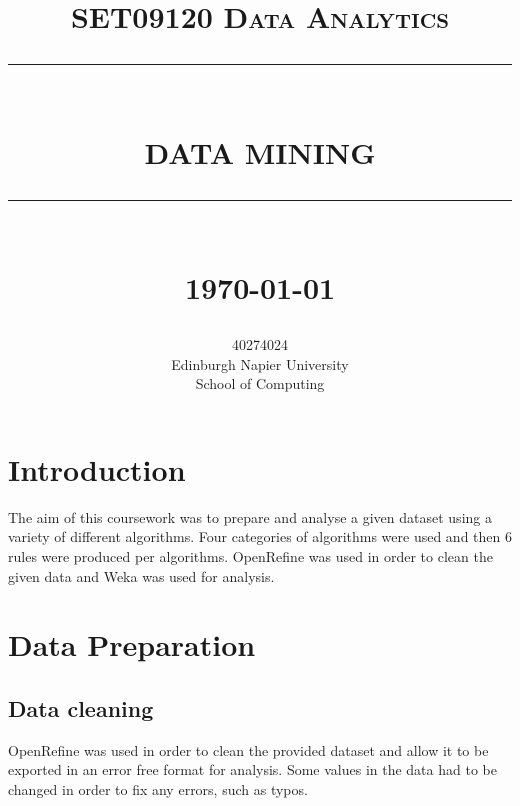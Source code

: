 \documentclass[12pt]{article}
\newcommand{\HRule}[1]{\rule{\linewidth}{#1}}
\begin{document}
\title{ \normalsize \textsc{SET09120 Data Analytics}
		\\ [2.0cm]
		\HRule{0.5pt} \\
		\LARGE \textbf{\uppercase{Data Mining}}
		\HRule{2pt} \\ [0.5cm]
		\normalsize \monthyeardate\today \vspace*{5\baselineskip}}

\author{
		40274024 \\ 
		Edinburgh Napier University \\
		School of Computing 
		\date{}}

\maketitle

\newpage

\sectionfont{\scshape}


\section{Introduction}
The aim of this coursework was to prepare and analyse a given dataset using a variety of different algorithms. Four categories of algorithms were used and then 6 rules were produced per algorithms. OpenRefine was used in order to clean the given data and Weka was used for analysis.


\section{Data Preparation}
\subsection{Data cleaning}
OpenRefine was used in order to clean the provided dataset and allow it to be exported in an error free format for analysis.
Some values in the data had to be changed in order to fix any errors, such as typos.
\end{document}
